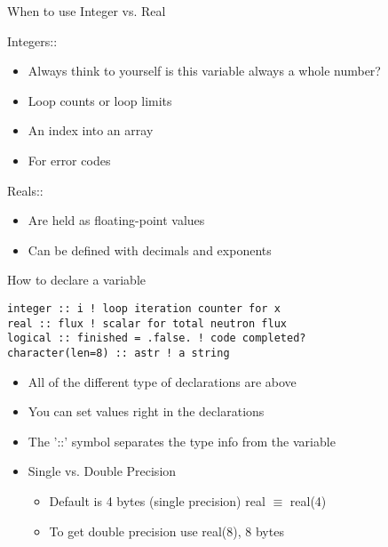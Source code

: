 \documentclass{beamer}
\begin{document}
\begin{frame}{When to use Integer vs. Real}

Integers::
  \begin{itemize}
    \item Always think to yourself is this variable always a whole number?
    \item Loop counts or loop limits
    \item An index into an array
    \item For error codes
  \end{itemize}

\vfill Reals::
  \begin{itemize}
    \item Are held as floating-point values 
    \item Can be defined with decimals and exponents
  \end{itemize}

\end{frame}
\begin{frame}{How to declare a variable}

  \texttt{integer  :: i                   ! loop iteration counter for x} \\
  \texttt{real     :: flux                ! scalar for total neutron flux} \\
  \texttt{logical  :: finished = .false.  ! code completed?} \\
  \texttt{character(len=8) :: astr        ! a string} \\
\vfill 
 \begin{itemize}
    \item All of the different type of declarations are above
    \vfill\item You can set values right in the declarations
    \vfill\item The '::' symbol separates the type info from the variable
    \vfill\item \alert{Single vs. Double Precision}
      \begin{itemize}
	\item Default is 4 bytes (single precision) real $\equiv$ real(4)
	\item To get double precision use real(8), 8 bytes
      \end{itemize}
  \end{itemize}
\end{frame}
\end{document}
